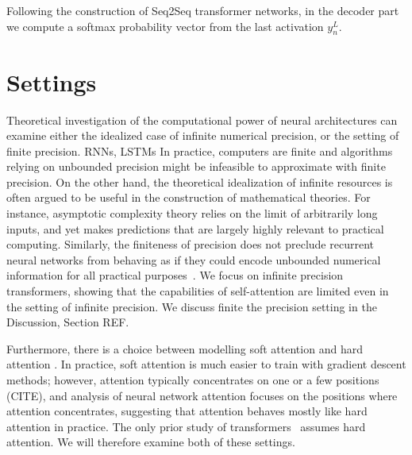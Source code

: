 \documentclass[11pt,a4paper]{article}
\begin{document}
Following the construction of Seq2Seq transformer networks, in the decoder part we compute a softmax probability vector from the last activation $y_{n}^L$.







\section{Settings}

Theoretical investigation of the computational power of neural architectures can examine either the idealized case of infinite numerical precision, or the setting of finite precision.
RNNs, LSTMs
In practice, computers are finite and algorithms relying on unbounded precision might be infeasible to approximate with finite precision.
On the other hand, the theoretical idealization of infinite resources is often argued to be useful in the construction of mathematical theories.
For instance, asymptotic complexity theory relies on the limit of arbitrarily long inputs, and yet makes predictions that are largely highly relevant to practical computing.
Similarly, the finiteness of precision does not preclude recurrent neural networks  from behaving as if they could encode unbounded numerical information for all practical purposes~\cite{weiss2018practical}.
We focus on infinite precision transformers, showing that the capabilities of self-attention are limited even in the setting of infinite precision.
We discuss finite the precision setting in the Discussion, Section REF.

Furthermore, there is a choice between modelling soft attention and hard attention \cite{shen2018reinforced}.
In practice, soft attention is much easier to train with gradient descent methods; however, attention typically concentrates on one or a few positions (CITE), and analysis of neural network attention focuses on the positions where attention concentrates, suggesting that attention behaves mostly like hard attention in practice.
The only prior study of transformers~\cite{perez2019turing} assumes hard attention.
We will therefore examine both of these settings.
\end{document}
